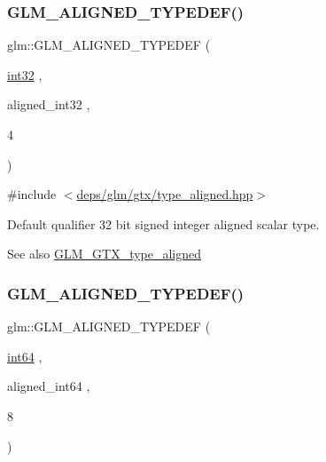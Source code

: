 \subsubsection{\texorpdfstring{G\+L\+M\+\_\+\+A\+L\+I\+G\+N\+E\+D\+\_\+\+T\+Y\+P\+E\+D\+E\+F()}{GLM\_ALIGNED\_TYPEDEF()}\hspace{0.1cm}{\footnotesize\ttfamily [39/209]}}
{\footnotesize\ttfamily glm\+::\+G\+L\+M\+\_\+\+A\+L\+I\+G\+N\+E\+D\+\_\+\+T\+Y\+P\+E\+D\+EF (\begin{DoxyParamCaption}\item[{\hyperlink{group__gtc__type__precision_ga632d8b25f6b61659f39ea4321fab92a4}{int32}}]{,  }\item[{aligned\+\_\+int32}]{,  }\item[{4}]{ }\end{DoxyParamCaption})}



{\ttfamily \#include $<$\hyperlink{gtx_2type__aligned_8hpp}{deps/glm/gtx/type\+\_\+aligned.\+hpp}$>$}

Default qualifier 32 bit signed integer aligned scalar type. \begin{DoxySeeAlso}{See also}
\hyperlink{group__gtx__type__aligned}{G\+L\+M\+\_\+\+G\+T\+X\+\_\+type\+\_\+aligned} 
\end{DoxySeeAlso}
\mbox{\label{group__gtx__type__aligned_ga1a8da2a8c51f69c07a2e7f473aa420f4}} 
\subsubsection{\texorpdfstring{G\+L\+M\+\_\+\+A\+L\+I\+G\+N\+E\+D\+\_\+\+T\+Y\+P\+E\+D\+E\+F()}{GLM\_ALIGNED\_TYPEDEF()}\hspace{0.1cm}{\footnotesize\ttfamily [40/209]}}
{\footnotesize\ttfamily glm\+::\+G\+L\+M\+\_\+\+A\+L\+I\+G\+N\+E\+D\+\_\+\+T\+Y\+P\+E\+D\+EF (\begin{DoxyParamCaption}\item[{\hyperlink{group__gtc__type__precision_ga435d75819cce297cc5fa21bd84ef89a5}{int64}}]{,  }\item[{aligned\+\_\+int64}]{,  }\item[{8}]{ }\end{DoxyParamCaption})}




